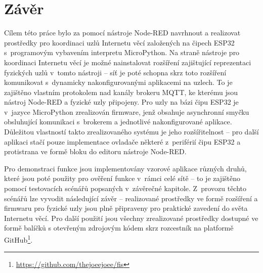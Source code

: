 \chapter{Závěr}
\label{ch:zaver}

Cílem této práce bylo za pomocí nástroje Node-RED navrhnout a realizovat prostředky pro koordinaci uzlů Internetu věcí
založených na čipech ESP32 s~programovým vybavením interpretu MicroPython.
Na straně nástroje pro koordinaci Internetu věcí je možné nainstalovat rozšíření zajištující reprezentaci fyzických
uzlů v~tomto nástroji
-- síť je poté schopna skrz toto rozšíření komunikovat s~dynamicky nakonfigurovanými aplikacemi na uzlech.
To je zajištěno vlastním protokolem nad kanály brokeru MQTT, ke kterému jsou nástroj Node-RED a fyzické uzly připojeny.
Pro uzly na bázi čipu ESP32 je v~jazyce MicroPython zrealizován firmware, jenž obsahuje asynchronní smyčku
obsluhující komunikaci s~brokerem a jednotlivé nakonfigurované aplikace.
Důležitou vlastností takto zrealizovaného systému je jeho rozšířitelnost -- pro další aplikaci stačí pouze implementace
ovladače některé z~periférií čipu ESP32 a protistrana ve formě bloku do editoru nástroje Node-RED.

Pro demonstraci funkce jsou implementovány vzorové aplikace různých druhů, které jsou poté použity pro ověření
funkce v~rámci celé sítě -- to je zajištěno pomocí testovacích scénářů popsaných v~závěrečné kapitole.
Z~provozu těchto scénářů lze vyvodit následující závěr -- realizované prostředky ve formě rozšíření a firmwaru pro
fyzické uzly jsou plně připraveny pro praktické zavedení do světa Internetu věcí.
Pro další použití jsou všechny zrealizované prostředky dostupné ve formě balíčků s otevřeným zdrojovým kódem skrz
rozcestník na platformě GitHub\footnote{\url{https://github.com/thejoeejoee/fis}}.